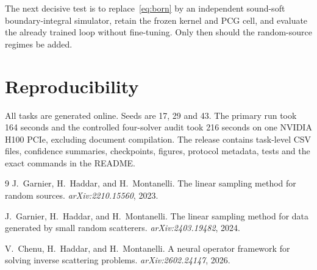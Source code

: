 \documentclass[10pt]{article}
\begin{document}
The next decisive test is to replace~\eqref{eq:born} by an independent
sound-soft boundary-integral simulator, retain the frozen kernel and PCG cell,
and evaluate the already trained loop without fine-tuning.  Only then should
the random-source regimes be added.

\section*{Reproducibility}

All tasks are generated online.  Seeds are 17, 29 and 43.  The primary run took
164 seconds and the controlled four-solver audit took 216 seconds on one NVIDIA
H100 PCIe, excluding document compilation.  The release contains task-level
CSV files, confidence summaries, checkpoints, figures, protocol metadata,
tests and the exact commands in the README.

\begin{thebibliography}{9}
J.~Garnier, H.~Haddar, and H.~Montanelli.
\newblock The linear sampling method for random sources.
\newblock \emph{arXiv:2210.15560}, 2023.

J.~Garnier, H.~Haddar, and H.~Montanelli.
\newblock The linear sampling method for data generated by small random
scatterers.
\newblock \emph{arXiv:2403.19482}, 2024.

V.~Chenu, H.~Haddar, and H.~Montanelli.
\newblock A neural operator framework for solving inverse scattering problems.
\newblock \emph{arXiv:2602.24147}, 2026.
\end{thebibliography}
\end{document}
